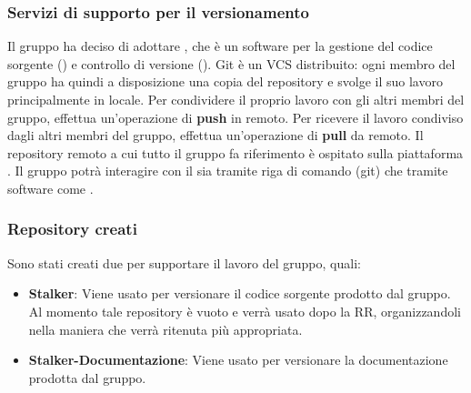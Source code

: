 \subsubsection{Servizi di supporto per il versionamento} 
Il gruppo ha deciso di adottare , che è un software per la gestione del codice sorgente () e controllo di versione ().
Git è un VCS distribuito: ogni membro del gruppo \Gruppo{} ha quindi a disposizione una copia del repository e svolge il suo lavoro principalmente in locale.
Per condividere il proprio lavoro con gli altri membri del gruppo, effettua un'operazione di \textbf{push} in remoto.
Per ricevere il lavoro condiviso dagli altri membri del gruppo, effettua un'operazione di \textbf{pull} da remoto.
Il repository remoto a cui tutto il gruppo fa riferimento è ospitato sulla piattaforma .
Il gruppo \Gruppo{} potrà interagire con il  sia tramite riga di comando (git) che tramite software come .

\subsubsection{Repository creati}
Sono stati creati due  per supportare il lavoro del gruppo, quali:
\begin{itemize}
	\item \textbf{Stalker}: Viene usato per versionare il codice sorgente prodotto dal gruppo.
	Al momento tale repository è vuoto e verrà usato dopo la RR, organizzandoli nella maniera che verrà ritenuta più appropriata.
	\item \textbf{Stalker-Documentazione}: Viene usato per versionare la documentazione prodotta dal gruppo.
\end{itemize}


